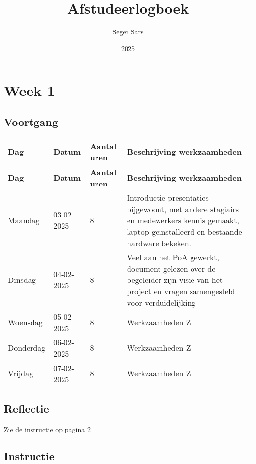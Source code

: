 \documentclass[a4paper,12pt]{article}
\title{Afstudeerlogboek}
\author{Seger Sars}
\date{2025}
\begin{document}
\maketitle

\newpage

\section*{Week 1}

\subsection*{Voortgang}

\begin{longtable}{|l|l|p{}|p{}|}
\hline
\textbf{Dag} & \textbf{Datum} & \textbf{Aantal uren} & \textbf{Beschrijving werkzaamheden} \\
\hline
\endfirsthead
\hline
\textbf{Dag} & \textbf{Datum} & \textbf{Aantal uren} & \textbf{Beschrijving werkzaamheden} \\
\hline
\endhead
\hline
\endfoot
\endlastfoot
Maandag   & 03-02-2025 & 8 & Introductie presentaties bijgewoont, met andere stagiairs en medewerkers kennis gemaakt, laptop geinstalleerd en bestaande hardware bekeken. \\ \hline
Dinsdag   & 04-02-2025 & 8 & Veel aan het PoA gewerkt, document gelezen over de begeleider zijn visie van het project en vragen samengesteld voor verduidelijking \\ \hline
Woensdag  & 05-02-2025 & 8 & Werkzaamheden Z \\ \hline
Donderdag & 06-02-2025 & 8 & Werkzaamheden Z \\ \hline
Vrijdag   & 07-02-2025 & 8 & Werkzaamheden Z \\ \hline

\hline

\end{longtable}

\subsection*{Reflectie}

Zie de instructie op pagina 2


\newpage

\subsection*{Instructie}
\end{document}
